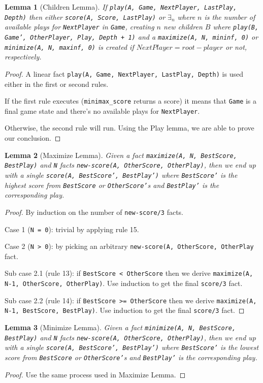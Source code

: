 \documentclass[9pt]{article}
\newtheorem{lemma}{Lemma}
\begin{document}
\begin{lemma}[Children Lemma]
If \texttt{play(A, Game, NextPlayer, LastPlay, Depth)} then either \texttt{score(A, Score,
      LastPlay)} or $\exists_n$ where $n$ is the number of available plays for
\texttt{NextPlayer} in \texttt{Game}, creating $n$ new children $B$ where \texttt{play(B,
      Game', OtherPlayer, Play, Depth + 1)} and a \texttt{maximize(A, N,
         mininf, 0)} or \texttt{minimize(A, N, maxinf, 0)} is created if
      $NextPlayer = root-player$ or not, respectively.
\end{lemma}
\begin{proof}
A linear fact \texttt{play(A, Game, NextPlayer, LastPlay, Depth)} is used either
in the first or second rules.

If the first rule executes (\texttt{minimax\_score} returns a score) it means that
\texttt{Game} is a final game state and there's no available plays for
\texttt{NextPlayer}.

Otherwise, the second rule will run. Using the Play lemma, we are able to prove
our conclusion.
\end{proof}

\begin{lemma}[Maximize Lemma]
Given a fact \texttt{maximize(A, N, BestScore, BestPlay)} and \texttt{N} facts
\texttt{new-score(A, OtherScore, OtherPlay)}, then we end up with a single
\texttt{score(A, BestScore', BestPlay')} where \texttt{BestScore'} is the
highest score from \texttt{BestScore} or \texttt{OtherScore'}s and
\texttt{BestPlay'} is the corresponding play.
\end{lemma}
\begin{proof}
By induction on the number of \texttt{new-score/3} facts.

Case 1 (\texttt{N = 0}): trivial by applying rule 15.

Case 2 (\texttt{N > 0}): by picking an arbitrary \texttt{new-score(A,
      OtherScore, OtherPlay} fact.

   Sub case 2.1 (rule 13): if \texttt{BestScore < OtherScore} then we derive
   \texttt{maximize(A, N-1, OtherScore, OtherPlay)}. Use induction to get the
   final \texttt{score/3} fact.

   Sub case 2.2 (rule 14): if \texttt{BestScore >= OtherScore} then we derive
   \texttt{maximize(A, N-1, BestScore, BestPlay)}. Use induction to get the
   final \texttt{score/3} fact.
\end{proof}

\begin{lemma}[Minimize Lemma]
Given a fact \texttt{minimize(A, N, BestScore, BestPlay)} and \texttt{N} facts
\texttt{new-score(A, OtherScore, OtherPlay)}, then we end up with a single
\texttt{score(A, BestScore', BestPlay')} where \texttt{BestScore'} is the
lowest score from \texttt{BestScore} or \texttt{OtherScore'}s and
\texttt{BestPlay'} is the corresponding play.
\end{lemma}
\begin{proof}
Use the same process used in Maximize Lemma.
\end{proof}
\end{document}
